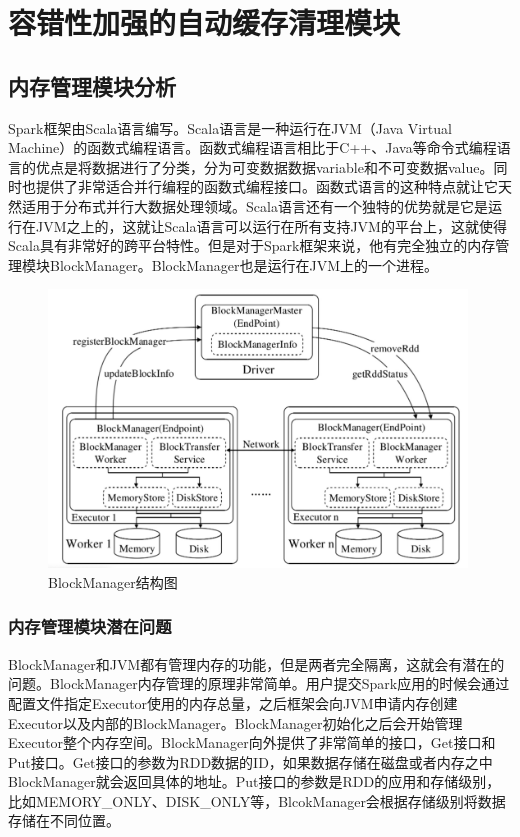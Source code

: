 \chapter{容错性加强的自动缓存清理模块}\label{chap:clean}

\section{内存管理模块分析}

Spark框架由Scala语言编写。Scala语言是一种运行在JVM（Java Virtual Machine）的函数式编程语言。函数式编程语言相比于C++、Java等命令式编程语言的优点是将数据进行了分类，分为可变数据数据variable和不可变数据value。同时也提供了非常适合并行编程的函数式编程接口。函数式语言的这种特点就让它天然适用于分布式并行大数据处理领域。Scala语言还有一个独特的优势就是它是运行在JVM之上的，这就让Scala语言可以运行在所有支持JVM的平台上，这就使得Scala具有非常好的跨平台特性。但是对于Spark框架来说，他有完全独立的内存管理模块BlockManager。BlockManager也是运行在JVM上的一个进程。

\begin{figure}[htbp]
    \centering
    \includegraphics[width=0.99\textwidth]{Img/block-manager.jpg}
    \caption{BlockManager结构图}
    \label{fig:block-manager}
\end{figure}

\subsection{内存管理模块潜在问题}

BlockManager和JVM都有管理内存的功能，但是两者完全隔离，这就会有潜在的问题。BlockManager内存管理的原理非常简单。用户提交Spark应用的时候会通过配置文件指定Executor使用的内存总量，之后框架会向JVM申请内存创建Executor以及内部的BlockManager。BlockManager初始化之后会开始管理Executor整个内存空间。BlockManager向外提供了非常简单的接口，Get接口和Put接口。Get接口的参数为RDD数据的ID，如果数据存储在磁盘或者内存之中BlockManager就会返回具体的地址。Put接口的参数是RDD的应用和存储级别，比如MEMORY\_ONLY、DISK\_ONLY等，BlcokManager会根据存储级别将数据存储在不同位置。

